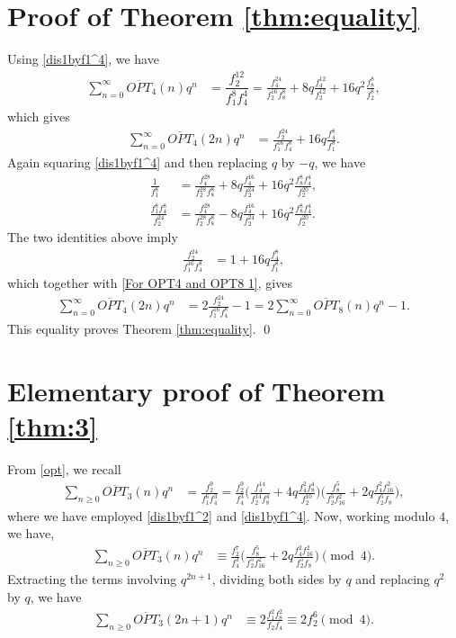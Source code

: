 \documentclass[12pt,reqno]{amsart}
\numberwithin{equation}{section}
\newcommand{\opt}{\overline{OPT}}
\begin{document}
\section{Proof of Theorem \ref{thm:equality}} \label{Proof-thm:equality}
Using \eqref{dis1byf1^4}, we have
\begin{align*}
    \sum_{n=0}^\infty\opt_4(n)q^n&=\dfrac{f_2^{12}}{f_1^{8}f_4^{4}}=\frac{f_4^{24}}{f_2^{16} f_8^8}+8q\frac{ f_4^{12} }{f_2^{12}}+16q^2\frac{f_8^8}{f_2^8},
\end{align*}
which gives
\begin{align}
    \sum_{n=0}^\infty\opt_4(2n)q^n&=\frac{f_2^{24}}{f_1^{16} f_4^8}+16q\frac{f_4^8}{f_1^8}.\label{For OPT4 and OPT8 1}
\end{align}
Again squaring \eqref{dis1byf1^4} and then replacing $q$ by $-q$, we have
\begin{align*}
    \frac{1}{f_1^8}&=\frac{f_4^{28}}{f_2^{28} f_8^8}+8q\frac{f_4^{16}}{f_2^{24}}+16q^2\frac{f_8^8 f_4^4}{f_2^{20}},\\
    \frac{f_1^8f_4^8}{f_2^{24}}&=\frac{f_4^{28}}{f_2^{28} f_8^8}-8q\frac{f_4^{16}}{f_2^{24}}+16q^2\frac{f_8^8 f_4^4}{f_2^{20}}.
\end{align*}
The two identities above imply
\begin{align*}
   \frac{f_2^{24}}{f_1^{16}f_4^8} &=  1+ 16q\frac{f_4^{8}}{f_1^{8}},
\end{align*}
which together with \eqref{For OPT4 and OPT8 1}, gives
\begin{align*}
    \sum_{n=0}^\infty\opt_4(2n)q^n&=2  \frac{f_2^{24}}{f_1^{16}f_4^8}-1=2\sum_{n=0}^\infty\opt_8(n)q^n-1.
\end{align*}
This equality proves Theorem \ref{thm:equality}. \qed

\section{Elementary proof of Theorem \ref{thm:3}}\label{sec:el2}
From \eqref{opt}, we recall
\begin{align}\label{n}
        \sum_{n\geq 0}\opt_3(n)q^n &=\frac{f_{2}^9}{f_{1}^6f_{4}^3}=  \frac{f_{2}^9}{f_{4}^3} \Bigg(\frac{f_{4}^{14}}{f_{2}^{14} f_{8}^4} + 4 q \frac{f_{4}^2 f_{8}^4}{f_{2}^{10}}\Bigg)\Bigg(\frac{f_{8}^5}{f_{2}^5 f_{16}^2} + 2 q \frac{f_{4}^2 f_{16}^2 }{f_{2}^5 f_{8}}\Bigg),
\end{align}
where we  have employed \eqref{dis1byf1^2} and \eqref{dis1byf1^4}. Now, working modulo $4$, we have,
\begin{align}
   \sum_{n\geq 0}\opt_3(n)q^n & \equiv \frac{f_{2}^7}{f_{4}^3} \Bigg(\frac{f_{8}^5}{f_{2}^5 f_{16}^2} + 2 q \frac{f_{4}^2 f_{16}^2 }{f_{2}^5 f_{8}}\Bigg) \pmod{4}.\label{opt(n)}
\end{align}
Extracting the terms involving $q^{2n+1}$, dividing both sides by $q$ and replacing $q^2$ by $q$, we have
\begin{align}
    \sum_{n\geq 0}\opt_3(2n+1)q^n &\equiv 2\frac{f_{1}^2 f_{8}^2}{f_{2}f_{4}} \equiv 2 f_{2}^6 \pmod{4}\label{opt(2n+14)}.
\end{align}
\end{document}
